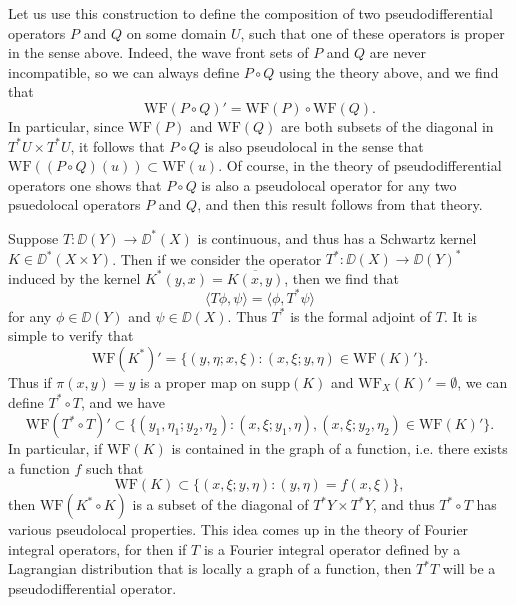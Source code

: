 \begin{example}
    Let us use this construction to define the composition of two pseudodifferential operators $P$ and $Q$ on some domain $U$, such that one of these operators is proper in the sense above. Indeed, the wave front sets of $P$ and $Q$ are never incompatible, so we can always define $P \circ Q$ using the theory above, and we find that
    \[ \text{WF}(P \circ Q)' = \text{WF}(P) \circ \text{WF}(Q). \]
    In particular, since $\text{WF}(P)$ and $\text{WF}(Q)$ are both subsets of the diagonal in $T^*U \times T^*U$, it follows that $P \circ Q$ is also pseudolocal in the sense that $\text{WF}((P \circ Q)(u)) \subset \text{WF}(u)$. Of course, in the theory of pseudodifferential operators one shows that $P \circ Q$ is also a pseudolocal operator for any two psuedolocal operators $P$ and $Q$, and then this result follows from that theory.
\end{example}

\begin{example}
    Suppose $T: \DD(Y) \to \DD^*(X)$ is continuous, and thus has a Schwartz kernel $K \in \DD^*(X \times Y)$. Then if we consider the operator $T^*: \DD(X) \to \DD(Y)^*$ induced by the kernel $K^*(y,x) = \overline{K(x,y)}$, then we find that
    \[ \langle T\phi, \psi \rangle = \langle \phi, T^* \psi \rangle \]
    for any $\phi \in \DD(Y)$ and $\psi \in \DD(X)$. Thus $T^*$ is the formal adjoint of $T$. It is simple to verify that
    \[ \text{WF}(K^*)' = \{ (y,\eta; x, \xi) : (x,\xi;y,\eta) \in \text{WF}(K)' \}. \]
    Thus if $\pi(x,y) = y$ is a proper map on $\text{supp}(K)$ and $\text{WF}_X(K)' = \emptyset$, we can define $T^* \circ T$, and we have
    \[ \text{WF}(T^* \circ T)' \subset \{ (y_1,\eta_1;y_2,\eta_2) : (x,\xi;y_1,\eta), (x,\xi;y_2,\eta_2) \in \text{WF}(K)' \}. \]
    In particular, if $\text{WF}(K)$ is contained in the graph of a function, i.e. there exists a function $f$ such that
    \[ \text{WF}(K) \subset \{ (x,\xi;y,\eta) : (y,\eta) = f(x,\xi) \}, \]
    then $\text{WF}(K^* \circ K)$ is a subset of the diagonal of $T^* Y \times T^* Y$, and thus $T^* \circ T$ has various pseudolocal properties. This idea comes up in the theory of Fourier integral operators, for then if $T$ is a Fourier integral operator defined by a Lagrangian distribution that is locally a graph of a function, then $T^* T$ will be a pseudodifferential operator.
\end{example}



